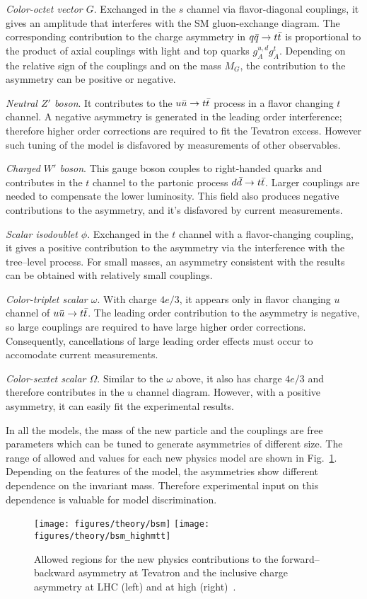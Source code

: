 {\em Color-octet vector $G$}. Exchanged in the $s$ channel via
flavor-diagonal couplings, it gives 
an amplitude that interferes with the SM gluon-exchange diagram. The
corresponding contribution to the charge asymmetry in
\mbox{$q\bar{q}{}\to t\bar{t}{}$} is proportional to the product of axial
couplings with light and top quarks $g_A^{u,d}g_A^t$. Depending on the
relative sign of the couplings and on the mass $M_G$, the contribution
to the asymmetry can be positive or negative. 

{\em Neutral $Z'$ boson}. It contributes to the $u\bar{u}{}\to t\bar{t}{}$
process in a flavor changing $t$ channel. A negative asymmetry
is generated in the leading order interference; therefore higher order
corrections are required to fit the Tevatron excess. However such
tuning of the model is disfavored by measurements of other observables.

{\em Charged $W'$ boson}. This gauge boson couples to right-handed
quarks and contributes in the $t$ channel to the partonic process
$d\bar{d}{}\to t\bar{t}{}$. Larger couplings are needed to compensate the
lower \ddbar{} luminosity. This field also produces negative
contributions to the asymmetry, and it's disfavored by current measurements.

{\em Scalar isodoublet $\phi$}.
Exchanged in the $t$ channel with a flavor-changing coupling, it gives
a positive contribution to the asymmetry via the interference with the
tree--level process. For small masses, an asymmetry consistent with the
\afb{} results can be obtained with relatively small couplings.

{\em Color-triplet scalar $\omega$}.
With charge $4e/3$, it appears only in flavor changing $u$ channel of
$u\bar{u}{}\to t\bar{t}{}$. The leading order contribution to the asymmetry
is negative, so large couplings are required to have large higher
order corrections. Consequently, cancellations of large leading order
effects must occur to accomodate current measurements.

{\em Color-sextet scalar $\Omega$}.
Similar to the $\omega$ above, it also has charge $4e/3$ and therefore
contributes in the $u$ channel diagram. However, with a positive
asymmetry, it can easily fit the experimental results.

In all the models, the mass of the new particle and the couplings are
free parameters which can be tuned to generate asymmetries of
different size. The range of allowed \ac{} and \afb{} values for each
new physics model are shown in Fig.~\ref{fig:bsmmodels}. Depending on
the features of the model, the asymmetries show different dependence
on the \ttbar{} invariant mass. Therefore experimental input on this
dependence is valuable for model discrimination. 

\begin{figure}[!htb]
  \centering
  \texttt{[image: figures/theory/bsm]} 
  \texttt{[image: figures/theory/bsm\_highmtt]} 
  \caption{Allowed regions for the new physics contributions to the forward--backward
    asymmetry at Tevatron and the inclusive charge asymmetry at LHC
    (left) and at high \mtt{} (right)~\cite{AguilarSaavedra:2011hz}.}
  \label{fig:bsmmodels}
\end{figure}


